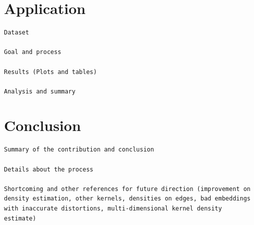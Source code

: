 \documentclass[11pt,a4paper,]{article}
\begin{document}
\hypertarget{application}{%
\section{Application}\label{application}}

\begin{verbatim}
Dataset

Goal and process

Results (Plots and tables)

Analysis and summary
\end{verbatim}

\hypertarget{conclusion}{%
\section{Conclusion}\label{conclusion}}

\begin{verbatim}
Summary of the contribution and conclusion

Details about the process

Shortcoming and other references for future direction (improvement on density estimation, other kernels, densities on edges, bad embeddings with inaccurate distortions, multi-dimensional kernel density estimate)
\end{verbatim}

\printbibliography
\end{document}
